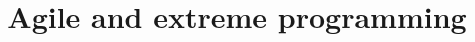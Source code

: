 \documentclass{beamer}
\title{Agile and extreme programming}
\begin{document}
    \begin{frame}

    \maketitle

    \end{frame}
    
    

	
\end{document}
